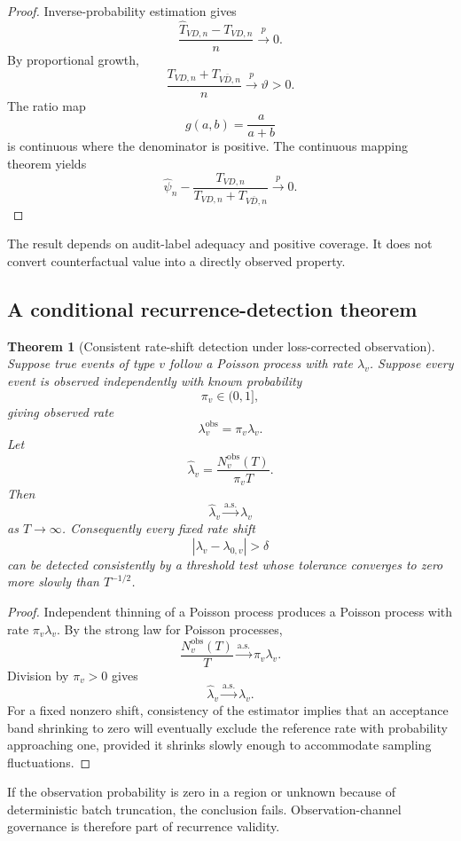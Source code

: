 \documentclass[11pt]{article}
\newtheorem{theorem}[definition]{Theorem}
\theoremstyle{definition}
\begin{document}
\begin{proof}
Inverse-probability estimation gives
\[
\frac{
\widehat T_{VD,n}-T_{VD,n}
}{n}
\xrightarrow{p}0.
\]
By proportional growth,
\[
\frac{
T_{VD,n}+T_{V\bar D,n}
}{n}
\xrightarrow{p}\vartheta>0.
\]
The ratio map
\[
g(a,b)=\frac{a}{a+b}
\]
is continuous where the denominator is positive. The continuous mapping theorem yields
\[
\widehat\psi_n
-
\frac{
T_{VD,n}
}{
T_{VD,n}+T_{V\bar D,n}
}
\xrightarrow{p}0.
\]
\end{proof}

The result depends on audit-label adequacy and positive coverage. It does not convert counterfactual value into a directly observed property.

\subsection{A conditional recurrence-detection theorem}

\begin{theorem}[Consistent rate-shift detection under loss-corrected observation]
Suppose true events of type \(v\) follow a Poisson process with rate \(\lambda_v\). Suppose every event is observed independently with known probability
\[
\pi_v\in(0,1],
\]
giving observed rate
\[
\lambda_v^{\mathrm{obs}}=\pi_v\lambda_v.
\]
Let
\[
\widehat\lambda_v
=
\frac{N_v^{\mathrm{obs}}(T)}{\pi_vT}.
\]
Then
\[
\widehat\lambda_v
\xrightarrow{\mathrm{a.s.}}
\lambda_v
\]
as \(T\to\infty\). Consequently every fixed rate shift
\[
|\lambda_v-\lambda_{0,v}|>\delta
\]
can be detected consistently by a threshold test whose tolerance converges to zero more slowly than \(T^{-1/2}\).
\end{theorem}

\begin{proof}
Independent thinning of a Poisson process produces a Poisson process with rate \(\pi_v\lambda_v\). By the strong law for Poisson processes,
\[
\frac{
N_v^{\mathrm{obs}}(T)
}{T}
\xrightarrow{\mathrm{a.s.}}
\pi_v\lambda_v.
\]
Division by \(\pi_v>0\) gives
\[
\widehat\lambda_v
\xrightarrow{\mathrm{a.s.}}
\lambda_v.
\]
For a fixed nonzero shift, consistency of the estimator implies that an acceptance band shrinking to zero will eventually exclude the reference rate with probability approaching one, provided it shrinks slowly enough to accommodate sampling fluctuations.
\end{proof}

If the observation probability is zero in a region or unknown because of deterministic batch truncation, the conclusion fails. Observation-channel governance is therefore part of recurrence validity.
\end{document}
